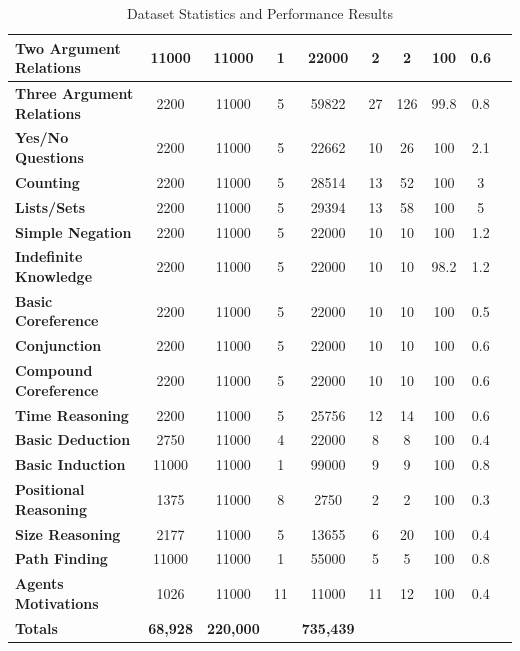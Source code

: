 \documentclass[letterpaper]{article}
\begin{document}
\begin{table}[b]
\begin{tabular}{|l||*{9}{c|}}
\textbf{\cellcolor{green!20}Two Argument Relations} & 11000 & 11000  & 1 & 22000 & 2 & 2 & 100 & 0.6\\\hline
\textbf{\cellcolor{green!20}Three Argument Relations} & 2200 & 11000 & 5 & 59822 & 27 & 126 & 99.8 & 0.8\\\hline
\textbf{\cellcolor{green!20}Yes/No Questions} & 2200 & 11000 & 5 & 22662 & 10 & 26 & 100 & 2.1\\\hline
\textbf{\cellcolor{green!20}Counting} & 2200 & 11000 & 5 & 28514 & 13 & 52 & 100 & 3\\\hline
\textbf{\cellcolor{green!20}Lists/Sets} & 2200 & 11000 & 5 & 29394 & 13 & 58 & 100 & 5\\\hline
\textbf{\cellcolor{green!20}Simple Negation}  & 2200 & 11000 & 5 & 22000 & 10 & 10 & 100 & 1.2\\\hline
\textbf{\cellcolor{green!20}Indefinite Knowledge} & 2200 & 11000 & 5 & 22000  & 10 & 10 & 98.2 & 1.2\\\hline
\textbf{\cellcolor{green!20}Basic Coreference} & 2200 & 11000 & 5 & 22000 & 10 & 10  & 100 & 0.5\\\hline
\textbf{\cellcolor{green!20}Conjunction} & 2200 & 11000  & 5 & 22000 & 10 & 10 & 100 & 0.6\\\hline
\textbf{\cellcolor{green!20}Compound Coreference} & 2200 & 11000 & 5 & 22000 & 10 & 10 & 100 & 0.6\\\hline
\textbf{\cellcolor{green!20}Time Reasoning} & 2200 & 11000  & 5 & 25756 & 12 & 14 & 100 & 0.6\\\hline
\textbf{\cellcolor{green!20}Basic Deduction} & 2750 & 11000 & 4 & 22000 & 8 & 8 & 100 & 0.4\\\hline
\textbf{\cellcolor{green!20}Basic Induction} & 11000 & 11000 & 1 & 99000 & 9 & 9 & 100 & 0.8\\\hline
\textbf{\cellcolor{green!20}Positional Reasoning} & 1375 & 11000 & 8 & 2750 & 2 & 2 & 100 & 0.3\\\hline
\textbf{\cellcolor{green!20}Size Reasoning} & 2177 & 11000 & 5 & 13655 & 6 & 20 & 100 & 0.4\\\hline
\textbf{\cellcolor{green!20}Path Finding} & 11000 & 11000 & 1 & 55000 & 5 & 5 & 100 & 0.8\\\hline
\textbf{\cellcolor{green!20}Agents Motivations} & 1026 & 11000 & 11 & 11000 & 11 & 12 & 100 & 0.4\\\hline
\textbf{\cellcolor{orange!20}\textbf{Totals}} & \textbf{68,928} & \textbf{220,000} &  & \textbf{735,439} &  &  &  & \\\hline
\end{tabular}
\caption{Dataset Statistics and Performance Results}
\label{table:square_performance_result}
\end{table}
\end{document}
